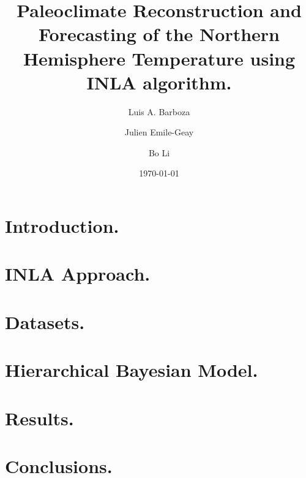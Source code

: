 \documentclass[11pt]{amsart}
\theoremstyle{plain}
\theoremstyle{definition}
\theoremstyle{remark}
\begin{document}
\title[Paleoclimate Reconstruction using INLA.]{Paleoclimate
  Reconstruction and Forecasting of the Northern Hemisphere Temperature using INLA algorithm.}

\author{Luis A. Barboza}
\address{Centro de Investigacion en Matematica Pura y Aplicada (CIMPA), Universidad de Costa Rica\\
San Jos\'e, Costa Rica}


\author{Julien Emile-Geay}
\address{Department of Earth Sciences \\
  University of Southern California \\
  Los Angeles, California, USA.
}

\author{Bo Li}
\address{Department of Statistics \\
  University of Illinois at Urbana-Champaign \\
  Champaign, Illinois, USA.
}

\date{\today}
\maketitle

\begin{abstract}

\end{abstract}

\section{Introduction.}
\label{sec:intro}

\section{INLA Approach.}
\label{sec:inla}

\section{Datasets.}
\label{sec:data}

\section{Hierarchical Bayesian Model.}
\label{sec:model}

\section{Results.}
\label{sec:results}

\section{Conclusions.}
\label{sec:conclusions}
\end{document}
